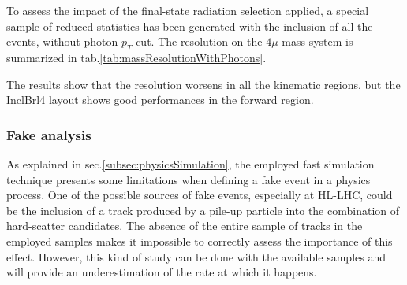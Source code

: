 \documentclass[a4paper,twoside,12pt]{article}
\begin{document}
To assess the impact of the final-state radiation selection applied, a special sample
of reduced statistics has been generated with the inclusion of all the events, without 
photon $p_{T}$ cut. The resolution on the $4\mu$ mass system is summarized
in tab.\ref{tab:massResolutionWithPhotons}.

\begin{table} [h]
	\caption{Comparison between the $4\mu$ mass resolutions with or without
	the $p_{T}$ selection applied during the generation stage. The values are expressed
	in GeV.}
	\label{tab:massResolutionWithPhotons}
\end{table}

The results show that the resolution worsens in all the kinematic regions, but the InclBrl4
layout shows good performances in the forward region.

\subsubsection*{Fake analysis}
As explained in sec.\ref{subsec:physicsSimulation}, the employed fast simulation technique 
presents some limitations when defining a fake event in a physics process. One of the
possible sources of fake events, especially at HL-LHC, could be the inclusion of a 
track produced by a pile-up particle into the combination of hard-scatter candidates.
The absence of the entire sample of tracks in the employed samples makes it impossible
to correctly assess the importance of this effect. However, this kind of study can be done with the 
available samples and will provide an underestimation of the rate at which it happens.\\
\end{document}
